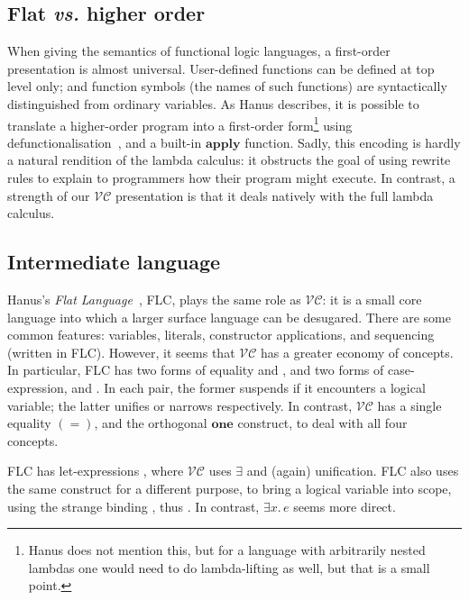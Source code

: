 \documentclass[acmsmall,review,dvipsnames]{acmart}
\newcommand{\Varid}[1]{\mathit{#1}}
\newcommand{\vs}{\emph{vs.}}
\newcommand{\versecalc}{$\mathcal{VC}$}
\begin{document}
\subsection{Flat {\vs} higher order}

When giving the semantics
of functional logic languages, a first-order presentation is almost universal.
User-defined functions can be defined at top level only;
and function symbols (the names of such functions) are syntactically
distinguished from ordinary variables. As Hanus describes, it is possible
to translate a higher-order program into a first-order
form\footnote{
  Hanus does not mention this, but for a language with arbitrarily nested lambdas
  one would need to do lambda-lifting as well, but that is a small point.}
using defunctionalisation~\cite[Section 3.3]{hanus:survey}, and a built-in
\ensuremath{\textbf{apply}} function.
Sadly, this encoding is hardly a natural rendition of the lambda calculus: 
it obstructs the goal of using rewrite rules to explain to programmers how
their program might execute. In contrast, a strength of our \versecalc{} 
presentation is that it deals natively with the full lambda calculus.

\subsection{Intermediate language}

Hanus's \emph{Flat Language}~\cite[Fig 1]{hanus:semantics}, FLC, plays the same role as \versecalc{}:
it is a small core language
into which a larger surface language can be desugared.
There are some common features: variables, literals, constructor applications,
and sequencing (written  in FLC).
However, it seems that \versecalc{} has a greater economy of concepts.
In particular, FLC
has two forms of equality  and , and two forms
of case-expression,  and .  In each pair, the former suspends
if it encounters a logical variable; the latter unifies or narrows
respectively. In contrast, \versecalc{}
has a single equality \ensuremath{(\mathrel{=})}, and the orthogonal \ensuremath{\textbf{one}} construct, to deal with all four concepts.

FLC has let-expressions , where \versecalc{} uses
\ensuremath{\exists} and (again) unification.
FLC also uses the same construct for a different purpose, to
bring a logical variable into scope, using the strange binding , thus .
In contrast, \ensuremath{\exists\Varid{x}.\,\Varid{e}} seems more direct.
\end{document}
